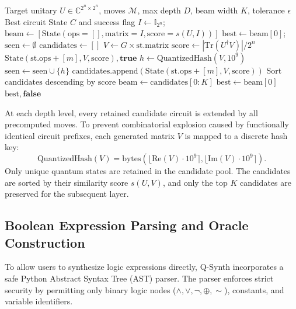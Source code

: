 \documentclass[11pt]{article}
\newcommand{\Tr}{\mathrm{Tr}}
\begin{document}
\begin{algorithm}[htbp]
\caption{Q-Synth Beam Search Synthesis Engine}
\label{alg:beam_search}
\begin{algorithmic}[1]
\Require Target unitary $U \in \mathbb{C}^{2^n \times 2^n}$, moves $\mathcal{M}$, max depth $D$, beam width $K$, tolerance $\epsilon$
\Ensure Best circuit State $C$ and success flag
\State $I \gets \mathbb{I}_{2^n}$; $\mathrm{beam} \gets [\mathrm{State}(\mathrm{ops}=[], \mathrm{matrix}=I, \mathrm{score}=s(U, I))]$
\State $\mathrm{best} \gets \mathrm{beam}[0]$; $\mathrm{seen} \gets \emptyset$
    \State $\mathrm{candidates} \gets []$
            \State $V \gets G \times \mathrm{st.matrix}$
            \State $\mathrm{score} \gets |\Tr(U^\dagger V)| / 2^n$
                \State \Return $\mathrm{State}(\mathrm{st.ops} + [m], V, \mathrm{score}), \mathbf{true}$
            \EndIf
            \State $h \gets \mathrm{QuantizedHash}(V, 10^9)$
                \State $\mathrm{seen} \gets \mathrm{seen} \cup \{h\}$
                \State $\mathrm{candidates.append}(\mathrm{State}(\mathrm{st.ops} + [m], V, \mathrm{score}))$
            \EndIf
        \EndFor
    \EndFor
    \State Sort $\mathrm{candidates}$ descending by $\mathrm{score}$
    \State $\mathrm{beam} \gets \mathrm{candidates}[0:K]$
        \State $\mathrm{best} \gets \mathrm{beam}[0]$
    \EndIf
\EndFor
\State \Return $\mathrm{best}, \mathbf{false}$
\end{algorithmic}
\end{algorithm}

At each depth level, every retained candidate circuit is extended by all precomputed moves. To prevent combinatorial explosion caused by functionally identical circuit prefixes, each generated matrix $V$ is mapped to a discrete hash key:
\begin{equation}
    \mathrm{QuantizedHash}(V) = \mathrm{bytes}\left( \lfloor \mathrm{Re}(V) \cdot 10^9 \rceil, \lfloor \mathrm{Im}(V) \cdot 10^9 \rceil \right).
\end{equation}
Only unique quantum states are retained in the candidate pool. The candidates are sorted by their similarity score $s(U, V)$, and only the top $K$ candidates are preserved for the subsequent layer.

\subsection{Boolean Expression Parsing and Oracle Construction}
To allow users to synthesize logic expressions directly, Q-Synth incorporates a safe Python Abstract Syntax Tree (AST) parser. The parser enforces strict security by permitting only binary logic nodes ($\land, \lor, \neg, \oplus, \sim$), constants, and variable identifiers.
\end{document}

